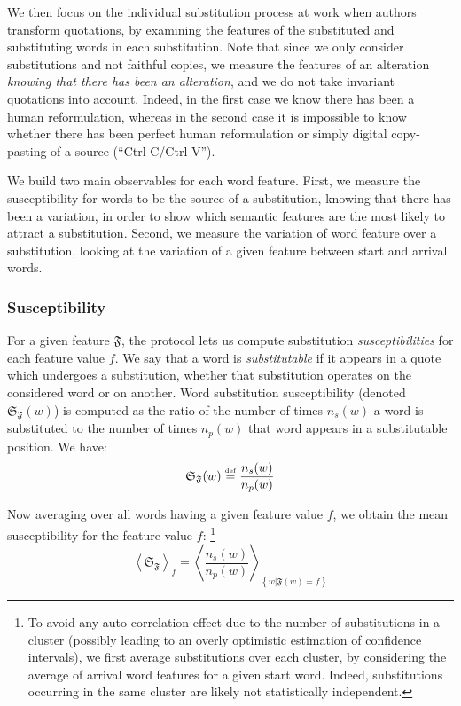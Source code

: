 We then focus on the individual substitution process at work when authors transform quotations, by examining the features of the substituted and substituting words in each substitution.
Note that since we only consider substitutions and not faithful copies, we measure the features of an alteration \emph{knowing that there has been an alteration}, and we do not take invariant quotations into account.
Indeed, in the first case we know there has been a human reformulation, whereas in the second case it is impossible to know whether there has been perfect human reformulation or simply digital copy-pasting of a source (``{\sc Ctrl-C}/{\sc Ctrl-V}'').

We build two main observables for each word feature.
First, we measure the susceptibility for words to be the source of a substitution, knowing that there has been a variation, in order to show which semantic features are the most likely to attract a substitution.
Second, we measure the variation of word feature over a substitution, looking at the variation of a given feature between start and arrival words.

\subsubsection{Susceptibility}

For a given feature $\mathfrak{F}$, the protocol lets us compute substitution \emph{susceptibilities} for each feature value $f$.
We say that a word is \emph{substitutable} if it appears in a quote which undergoes a substitution, whether that substitution operates on the considered word or on another.
Word substitution susceptibility (denoted $\mathfrak{S}_{\mathfrak{F}}(w)$) is computed as the ratio of the number of times $n_s(w)$ a word is substituted to the number of times $n_p(w)$ that word appears in a substitutable position.
We have:
$$\mathfrak{S}_{\mathfrak{F}}(w) \overset{\underset{\mathrm{def}}{}}{=} \frac{n_s(w)}{n_p(w)}$$

Now averaging over all words having a given feature value $f$, we obtain the mean susceptibility for the feature value $f$:
\footnote{To avoid any auto-correlation effect due to the number of substitutions in a cluster (possibly leading to an overly optimistic estimation of confidence intervals), we first average substitutions over each cluster, by considering the average of arrival word features for a given start word.
Indeed, substitutions occurring in the same cluster are likely not statistically independent.}
$$\left< \mathfrak{S}_{\mathfrak{F}} \right>_f = \left< \frac{n_s(w)}{n_p(w)} \right>_{\left\lbrace w | \mathfrak{F}(w) = f \right\rbrace}$$

